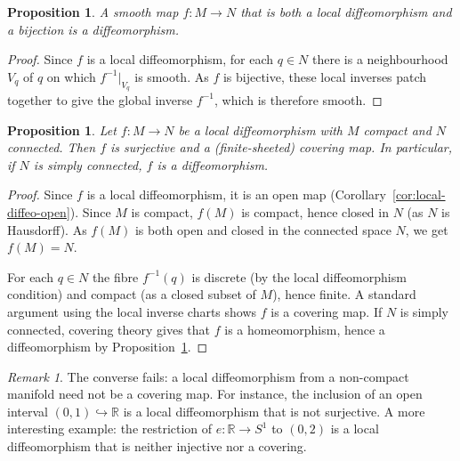 \documentclass[12pt,a4paper,openany]{book}
\newtheorem{proposition}[theorem]{Proposition}
\theoremstyle{definition}
\theoremstyle{remark}
\newtheorem{remark}[theorem]{Remark}
\newcommand{\R}{\mathbb{R}}
\begin{document}
\begin{proposition}\label{prop:local-diffeo-injective}
A smooth map $f \colon M \to N$ that is both a local diffeomorphism and a
bijection is a diffeomorphism.
\end{proposition}

\begin{proof}
Since $f$ is a local diffeomorphism, for each $q \in N$ there is a
neighbourhood $V_q$ of $q$ on which $f^{-1}|_{V_q}$ is smooth.  As $f$ is
bijective, these local inverses patch together to give the global inverse
$f^{-1}$, which is therefore smooth.
\end{proof}

\begin{proposition}\label{prop:local-diffeo-covering}
Let $f \colon M \to N$ be a local diffeomorphism with $M$ compact and $N$
connected.  Then $f$ is surjective and a (finite-sheeted) covering map.
In particular, if $N$ is simply connected, $f$ is a diffeomorphism.
\end{proposition}

\begin{proof}
Since $f$ is a local diffeomorphism, it is an open map
(Corollary~\ref{cor:local-diffeo-open}).  Since $M$ is compact, $f(M)$ is
compact, hence closed in $N$ (as $N$ is Hausdorff).  As $f(M)$ is both open
and closed in the connected space $N$, we get $f(M) = N$.

For each $q \in N$ the fibre $f^{-1}(q)$ is discrete (by the local
diffeomorphism condition) and compact (as a closed subset of $M$), hence
finite.  A standard argument using the local inverse charts shows $f$ is a
covering map.  If $N$ is simply connected, covering theory gives that $f$ is
a homeomorphism, hence a diffeomorphism by
Proposition~\ref{prop:local-diffeo-injective}.
\end{proof}

\begin{remark}\label{rem:local-not-global}
The converse fails: a local diffeomorphism from a non-compact manifold need
not be a covering map.  For instance, the inclusion of an open interval
$(0,1) \hookrightarrow \R$ is a local diffeomorphism that is not surjective.
A more interesting example: the restriction of $e \colon \R \to S^1$ to
$(0, 2)$ is a local diffeomorphism that is neither injective nor a covering.
\end{remark}

\end{document}
